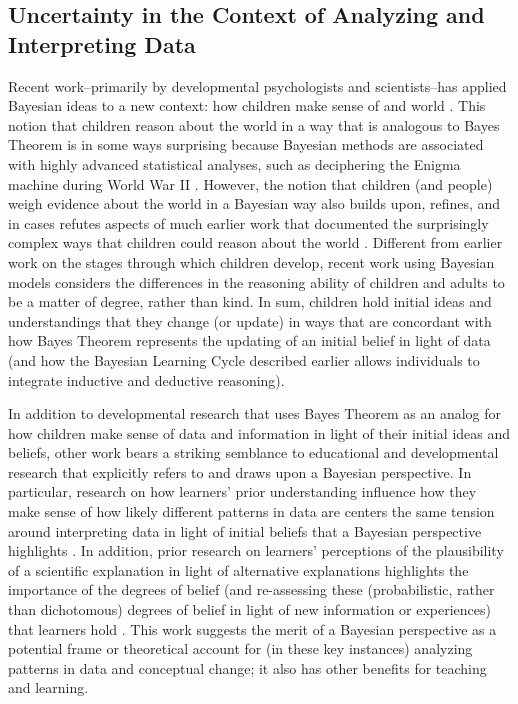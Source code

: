 \documentclass[man]{apa7}
\begin{document}
\subsection{Uncertainty in the Context of Analyzing and Interpreting Data}

Recent work--primarily by developmental psychologists and scientists--has applied Bayesian ideas to a new context: how children make sense of and world \parencite{g12, tgk06, tgk06}. This notion that children reason about the world in a way that is analogous to Bayes Theorem is in some ways surprising because Bayesian methods are associated with highly advanced statistical analyses, such as deciphering the Enigma machine during World War II \parencite{mcgrayne2011theory}. However, the notion that children (and people) weigh evidence about the world in a Bayesian way also builds upon, refines, and in cases refutes aspects of much earlier work that  documented the surprisingly complex ways that children could reason about the world \textcite{pi69}. Different from earlier work on the stages through which children develop, recent work using Bayesian models considers the differences in the reasoning ability of children and adults to be a matter of degree, rather than kind. In sum, children hold initial ideas and understandings that they change (or update) in ways that are concordant with how Bayes Theorem represents the updating of an initial belief in light of data (and how the Bayesian Learning Cycle described earlier allows individuals to integrate inductive and deductive reasoning).

In addition to developmental research that uses Bayes Theorem as an analog for how children make sense of data and information in light of their initial ideas and beliefs, other work bears a striking semblance to educational and developmental research that explicitly refers to and draws upon a Bayesian perspective. In particular, research on how learners’ prior understanding influence how they make sense of how likely different patterns in data are centers the same tension around interpreting data in light of initial beliefs that a Bayesian perspective highlights \parencite[e.g., ][]{kd88, mkm07, ssc07}. In addition, prior research on learners' perceptions of the plausibility of a scientific explanation in light of alternative explanations highlights the importance of the degrees of belief (and re-assessing these (probabilistic, rather than dichotomous) degrees of belief in light of new information or experiences) that learners hold \parencite[e.g., ][]{lombardi2013plausibility, lombardi2016plausibility}. This work suggests the merit of a Bayesian perspective as a potential frame or theoretical account for (in these key instances) analyzing patterns in data and conceptual change; it also has other benefits for teaching and learning. \\
\end{document}
